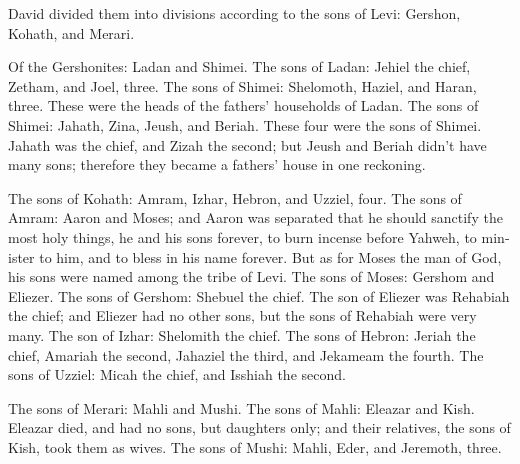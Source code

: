 \begin{paracol}{2}
\begin{otherlanguage}{english}
 David divided them into divisions according to the sons
of Levi: Gershon, Kohath, and Merari.

 Of the Gershonites: Ladan and Shimei.  The
sons of Ladan: Jehiel the chief, Zetham, and Joel, three. 
The sons of Shimei: Shelomoth, Haziel, and Haran, three. These were the
heads of the fathers' households of Ladan.  The sons of
Shimei: Jahath, Zina, Jeush, and Beriah. These four were the sons of
Shimei.  Jahath was the chief, and Zizah the second; but
Jeush and Beriah didn't have many sons; therefore they became a fathers'
house in one reckoning.

 The sons of Kohath: Amram, Izhar, Hebron, and Uzziel,
four.  The sons of Amram: Aaron and Moses; and Aaron was
separated that he should sanctify the most holy things, he and his sons
forever, to burn incense before Yahweh, to minister to him, and to bless
in his name forever.  But as for Moses the man of God,
his sons were named among the tribe of Levi.  The sons of
Moses: Gershom and Eliezer.  The sons of Gershom: Shebuel
the chief.  The son of Eliezer was Rehabiah the chief;
and Eliezer had no other sons, but the sons of Rehabiah were very many.
 The son of Izhar: Shelomith the chief. 
The sons of Hebron: Jeriah the chief, Amariah the second, Jahaziel the
third, and Jekameam the fourth.  The sons of Uzziel:
Micah the chief, and Isshiah the second.

 The sons of Merari: Mahli and Mushi. The sons of Mahli:
Eleazar and Kish.  Eleazar died, and had no sons, but
daughters only; and their relatives, the sons of Kish, took them as
wives.  The sons of Mushi: Mahli, Eder, and Jeremoth,
three.


\end{otherlanguage}
\end{paracol}
